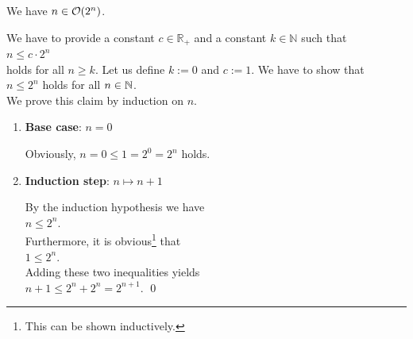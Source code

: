 \example
We have  $n \in \mathcal{O}(2^n)$. 
\ex

\proof
We have to provide a constant $c \in \mathbb{R}_+$ and a constant $k\in\mathbb{N}$ such that 
\\[0.2cm]
\hspace*{1.3cm}
$ n \leq c \cdot 2^n$ 
\\[0.2cm]
holds for all $n \geq k$.  Let us define $k := 0$ and $c := 1$.  We have to show that \\[0.2cm]
\hspace*{1.3cm} $n \leq 2^n$ \quad holds for all $n \in {\mathbb N}$.
\\[0.2cm]
We prove this claim by induction on $n$.
\begin{enumerate}
\item \textbf{Base case}: $n = 0$

      Obviously, $n = 0 \leq 1 = 2^0 = 2^n$ holds.  
\item \textbf{Induction step}: $n \mapsto n + 1$

      By the induction hypothesis we have 
      \\[0.2cm]
      \hspace*{1.3cm}
      $n \leq 2^n$.    
      \\[0.2cm]
      Furthermore, it is obvious\footnote{This can be shown inductively.}
      that
      \\[0.2cm]
      \hspace*{1.3cm}
      $1 \leq 2^n$.
      \\[0.2cm]
      Adding these two inequalities yields
      \\[0.2cm]
      \hspace*{1.3cm} $n+1 \leq 2^n + 2^n = 2^{n+1}$. \qed
\end{enumerate} 

